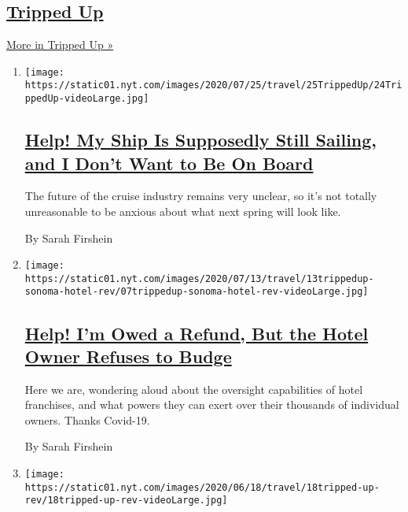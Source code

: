 \hypertarget{tripped-up}{%
\subsection{\texorpdfstring{\href{/column/tripped-up}{Tripped
Up}}{Tripped Up}}\label{tripped-up}}

\href{/column/tripped-up}{More in Tripped Up »}

\begin{enumerate}
\def\labelenumi{\arabic{enumi}.}
\item
  \texttt{[image: https://static01.nyt.com/images/2020/07/25/travel/25TrippedUp/24TrippedUp-videoLarge.jpg]}

  \hypertarget{help-my-ship-is-supposedly-still-sailing-and-i-dont-want-to-be-on-board}{%
  \subsection{\texorpdfstring{\href{/2020/07/22/travel/virus-cruise-refunds.html}{Help!
  My Ship Is Supposedly Still Sailing, and I Don't Want to Be On
  Board}}{Help! My Ship Is Supposedly Still Sailing, and I Don't Want to Be On Board}}\label{help-my-ship-is-supposedly-still-sailing-and-i-dont-want-to-be-on-board}}

  The future of the cruise industry remains very unclear, so it's not
  totally unreasonable to be anxious about what next spring will look
  like.

  By Sarah Firshein
\item
  \texttt{[image: https://static01.nyt.com/images/2020/07/13/travel/13trippedup-sonoma-hotel-rev/07trippedup-sonoma-hotel-rev-videoLarge.jpg]}

  \hypertarget{help-im-owed-a-refund-but-the-hotel-owner-refuses-to-budge}{%
  \subsection{\texorpdfstring{\href{/2020/07/07/travel/virus-refunds-hotel-franchises.html}{Help!
  I'm Owed a Refund, But the Hotel Owner Refuses to
  Budge}}{Help! I'm Owed a Refund, But the Hotel Owner Refuses to Budge}}\label{help-im-owed-a-refund-but-the-hotel-owner-refuses-to-budge}}

  Here we are, wondering aloud about the oversight capabilities of hotel
  franchises, and what powers they can exert over their thousands of
  individual owners. Thanks Covid-19.

  By Sarah Firshein
\item
  \texttt{[image: https://static01.nyt.com/images/2020/06/18/travel/18tripped-up-rev/18tripped-up-rev-videoLarge.jpg]}


\end{enumerate}
